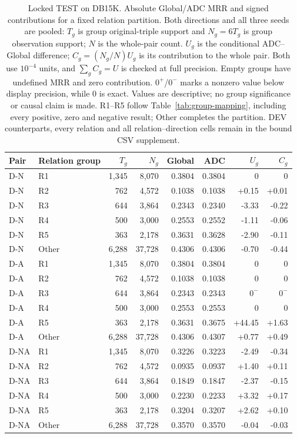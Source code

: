 \begin{table}[htbp]
\centering\footnotesize\setlength{\tabcolsep}{3pt}
\caption{Locked TEST on DB15K. Absolute Global/ADC MRR and signed contributions for a fixed relation partition. Both directions and all three seeds are pooled: $T_g$ is group original-triple support and $N_g=6T_g$ is group observation support; $N$ is the whole-pair count. $U_g$ is the conditional ADC--Global difference; $C_g=(N_g/N)U_g$ is its contribution to the whole pair. Both use $10^{-4}$ units, and $\sum_g C_g=U$ is checked at full precision. Empty groups have undefined MRR and zero contribution. $0^{+}$/$0^{-}$ marks a nonzero value below display precision, while 0 is exact. Values are descriptive; no group significance or causal claim is made. R1--R5 follow Table~\ref{tab:group-mapping}, including every positive, zero and negative result; Other completes the partition. DEV counterparts, every relation and all relation--direction cells remain in the bound CSV supplement.}
\label{tab:group-named_db15k}
\begin{tabular}{llrrrrrr}
\toprule
Pair & Relation group & $T_g$ & $N_g$ & Global & ADC & $U_g$ & $C_g$\\
\midrule
D-N & R1 & 1,345 & 8,070 & 0.3804 & 0.3804 & 0 & 0\\
D-N & R2 & 762 & 4,572 & 0.1038 & 0.1038 & +0.15 & +0.01\\
D-N & R3 & 644 & 3,864 & 0.2343 & 0.2340 & -3.33 & -0.22\\
D-N & R4 & 500 & 3,000 & 0.2553 & 0.2552 & -1.11 & -0.06\\
D-N & R5 & 363 & 2,178 & 0.3631 & 0.3628 & -2.90 & -0.11\\
D-N & Other & 6,288 & 37,728 & 0.4306 & 0.4306 & -0.70 & -0.44\\
D-A & R1 & 1,345 & 8,070 & 0.3804 & 0.3804 & 0 & 0\\
D-A & R2 & 762 & 4,572 & 0.1038 & 0.1038 & 0 & 0\\
D-A & R3 & 644 & 3,864 & 0.2343 & 0.2343 & $0^{-}$ & $0^{-}$\\
D-A & R4 & 500 & 3,000 & 0.2553 & 0.2553 & 0 & 0\\
D-A & R5 & 363 & 2,178 & 0.3631 & 0.3675 & +44.45 & +1.63\\
D-A & Other & 6,288 & 37,728 & 0.4306 & 0.4307 & +0.77 & +0.49\\
D-NA & R1 & 1,345 & 8,070 & 0.3226 & 0.3223 & -2.49 & -0.34\\
D-NA & R2 & 762 & 4,572 & 0.0935 & 0.0937 & +1.40 & +0.11\\
D-NA & R3 & 644 & 3,864 & 0.1849 & 0.1847 & -2.37 & -0.15\\
D-NA & R4 & 500 & 3,000 & 0.2230 & 0.2233 & +3.32 & +0.17\\
D-NA & R5 & 363 & 2,178 & 0.3204 & 0.3207 & +2.62 & +0.10\\
D-NA & Other & 6,288 & 37,728 & 0.3570 & 0.3570 & -0.04 & -0.03\\
\bottomrule
\end{tabular}
\end{table}
